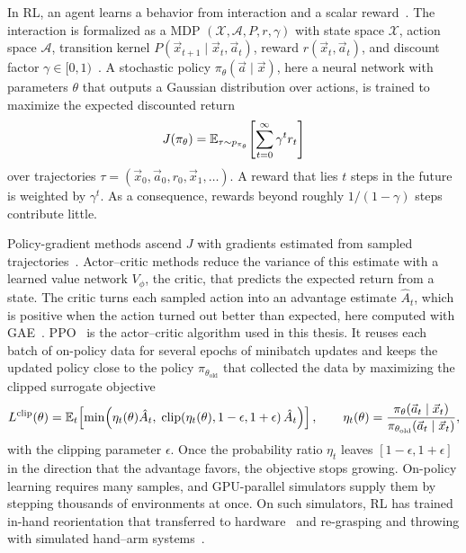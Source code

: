 In \ac{RL}, an agent learns a behavior from interaction and a scalar reward~\cite{Sutton2018,Kober2013}. The interaction is formalized as a \ac{MDP} $(\mathcal{X}, \mathcal{A}, P, r, \gamma)$ with state space $\mathcal{X}$, action space $\mathcal{A}$, transition kernel $P(\vec{x}_{t+1}\mid \vec{x}_t,\vec{a}_t)$, reward $r(\vec{x}_t,\vec{a}_t)$, and discount factor $\gamma\in[0,1)$~\cite{Sutton2018}. A stochastic policy $\pi_\theta(\vec{a}\mid\vec{x})$, here a neural network with parameters $\theta$ that outputs a Gaussian distribution over actions, is trained to maximize the expected discounted return
\begin{equation}\label{eq:rl-objective}
  J(\pi_\theta)=\mathbb{E}_{\tau\sim p_{\pi_\theta}}\!\left[\sum_{t=0}^{\infty}\gamma^{t}r_t\right]
\end{equation}
over trajectories $\tau=(\vec{x}_0,\vec{a}_0,r_0,\vec{x}_1,\dots)$. A reward that lies $t$ steps in the future is weighted by $\gamma^{t}$. As a consequence, rewards beyond roughly $1/(1-\gamma)$ steps contribute little.

Policy-gradient methods ascend $J$ with gradients estimated from sampled trajectories~\cite{Williams1992,Sutton2018}. Actor--critic methods reduce the variance of this estimate with a learned value network $V_\phi$, the critic, that predicts the expected return from a state. The critic turns each sampled action into an advantage estimate $\hat{A}_t$, which is positive when the action turned out better than expected, here computed with \ac{GAE}~\cite{Schulman2016}. \Acf{PPO}~\cite{Schulman2017} is the actor--critic algorithm used in this thesis. It reuses each batch of on-policy data for several epochs of minibatch updates and keeps the updated policy close to the policy $\pi_{\theta_{\mathrm{old}}}$ that collected the data by maximizing the clipped surrogate objective
\begin{equation}\label{eq:ppo}
  L^{\mathrm{clip}}(\theta) = \mathbb{E}_t\!\left[\min\!\left(\eta_t(\theta)\hat{A}_t,\; \operatorname{clip}\!\left(\eta_t(\theta),1-\epsilon,1+\epsilon\right)\hat{A}_t\right)\right],
  \qquad \eta_t(\theta)=\frac{\pi_\theta(\vec{a}_t\mid\vec{x}_t)}{\pi_{\theta_{\mathrm{old}}}(\vec{a}_t\mid\vec{x}_t)},
\end{equation}
with the clipping parameter $\epsilon$. Once the probability ratio $\eta_t$ leaves $[1-\epsilon,1+\epsilon]$ in the direction that the advantage favors, the objective stops growing. On-policy learning requires many samples, and GPU-parallel simulators supply them by stepping thousands of environments at once. On such simulators, \ac{RL} has trained in-hand reorientation that transferred to hardware~\cite{Handa2024} and re-grasping and throwing with simulated hand--arm systems~\cite{Petrenko2023}.

